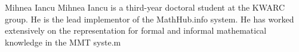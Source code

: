 \begin{participant}[type=JRes,PM=24,salary=5900,gender=male]{Mihnea Iancu}
  Mihnea Iancu is a third-year doctoral student at the KWARC group. He is the lead
  implementor of the MathHub.info system. He has worked extensively on the representation
  for formal and informal mathematical knowledge in the MMT syste.m
\end{participant}



 


